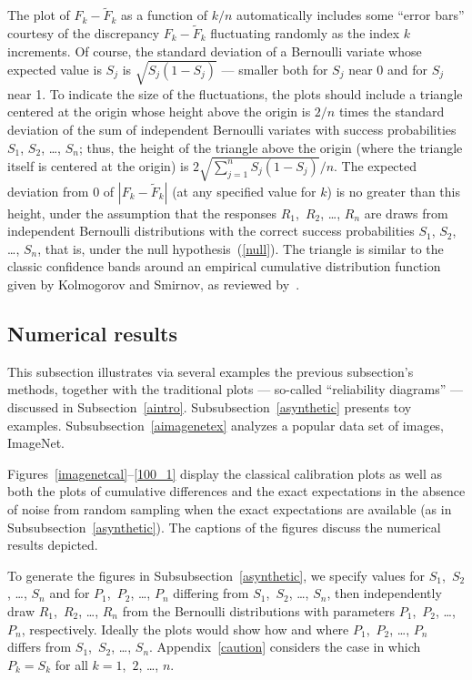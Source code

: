 \documentclass{article}
\begin{document}
The plot of $F_k-\tilde{F}_k$ as a function of $k/n$ automatically
includes some ``error bars'' courtesy of the discrepancy
$F_k-\tilde{F}_k$ fluctuating randomly as the index $k$ increments.
Of course, the standard deviation of a Bernoulli variate
whose expected value is $S_j$ is $\sqrt{S_j (1-S_j)}$ ---
smaller both for $S_j$ near 0 and for $S_j$ near 1.
To indicate the size of the fluctuations, the plots should include
a triangle centered at the origin whose height above the origin is $2/n$
times the standard deviation of the sum of independent Bernoulli variates
with success probabilities $S_1$, $S_2$, \dots, $S_n$;
thus, the height of the triangle above the origin 
(where the triangle itself is centered at the origin) is
$2 \sqrt{\sum_{j=1}^n S_j (1-S_j)} / n$.
The expected deviation from 0 of $|F_k-\tilde{F}_k|$
(at any specified value for $k$)
is no greater than this height, under the assumption that the responses
$R_1$,~$R_2$, \dots, $R_n$ are draws
from independent Bernoulli distributions with the correct success probabilities
$S_1$, $S_2$, \dots, $S_n$, that is, under the null hypothesis~(\ref{null}).
The triangle is similar to the classic confidence bands
around an empirical cumulative distribution function
given by Kolmogorov and Smirnov, as reviewed by~\cite{doksum}.


\subsection{Numerical results}
\label{aresults}

This subsection illustrates via several examples
the previous subsection's methods,
together with the traditional plots --- so-called ``reliability diagrams'' ---
discussed in Subsection~\ref{aintro}.
Subsubsection~\ref{asynthetic} presents toy examples.
Subsubsection~\ref{aimagenetex} analyzes a popular data set of images,
ImageNet.

Figures~\ref{imagenetcal}--\ref{100_1} display the classical calibration plots
as well as both the plots of cumulative differences and the exact expectations
in the absence of noise from random sampling when the exact expectations
are available (as in Subsubsection~\ref{asynthetic}).
The captions of the figures discuss the numerical results depicted.

To generate the figures in Subsubsection~\ref{asynthetic},
we specify values for $S_1$,~$S_2$, \dots, $S_n$
and for $P_1$,~$P_2$, \dots, $P_n$ differing from $S_1$,~$S_2$, \dots, $S_n$,
then independently draw $R_1$,~$R_2$, \dots, $R_n$
from the Bernoulli distributions with parameters $P_1$,~$P_2$, \dots, $P_n$,
respectively. Ideally the plots would show how and where 
$P_1$,~$P_2$, \dots, $P_n$ differs from $S_1$,~$S_2$, \dots, $S_n$.
Appendix~\ref{caution} considers the case in which $P_k = S_k$
for all $k = 1$,~$2$, \dots, $n$.
\end{document}
